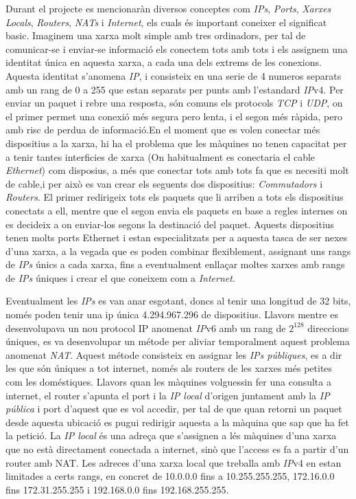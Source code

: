 Durant el projecte es mencionaràn diversos conceptes com \textit{IPs}, \textit{Ports}, \textit{Xarxes Locals}, \textit{Routers}, \textit{NATs} i \textit{Internet}, els cuals és important coneixer el significat basic. Imaginem una xarxa molt simple amb tres ordinadors, per tal de comunicar-se i enviar-se informació els conectem tots amb tots i els assignem una identitat única en aquesta xarxa, a cada una dels extrems de les conexions. Aquesta identitat s'anomena \textit{IP}, i consisteix en una serie de 4 numeros separats amb un rang de 0 a 255 que estan separats per punts amb l'estandard \textit{IP}v4. Per enviar un paquet i rebre una resposta, són comuns els protocols \textit{TCP} i \textit{UDP}, on el primer permet una conexió més segura pero lenta, i el segon més ràpida, pero amb risc de perdua de informació.En el moment que es volen conectar més dispositius a la xarxa, hi ha el problema que les màquines no tenen capacitat per a tenir tantes interficies de xarxa (On habitualment es conectaria el cable \textit{Ethernet}) com disposius, a més que conectar tots amb tots fa que es necesiti molt de cable,i per això es van crear els seguents dos dispositius: \textit{Commutadors} i \textit{Routers}. El primer redirigeix tots els paquets que li arriben a tots els dispositius conectats a ell, mentre que el segon envia els paquets en base a regles internes on es decideix a on enviar-los segons la destinació del paquet. Aquests dispositius tenen molts ports Ethernet i estan especialitzats per a aquesta tasca de ser nexes d'una xarxa, a la vegada que es poden combinar flexiblement, assignant uns rangs de \textit{IPs} únics a cada xarxa, fins a eventualment enllaçar moltes xarxes amb rangs de \textit{IPs} úniques i crear el que coneixem com a \textit{Internet}.\cite{hunt_tcpip_2002}

Eventualment les \textit{IPs} es van anar esgotant, doncs al tenir una longitud de 32 bits, només poden tenir una ip única 4.294.967.296 de dispositius. Llavors mentre es desenvolupava un nou protocol IP anomenat \textit{IP}v6 amb un rang de $2^{128}$ direccions úniques, es va desenvolupar un métode per aliviar temporalment aquest problema anomenat \textit{NAT}. Aquest métode consisteix en assignar les \textit{IPs públiques}, es a dir les que són úniques a tot internet, només als routers de les xarxes més petites com les doméstiques. Llavors quan les màquines volguessin fer una consulta a internet, el router s'apunta el port i la \textit{IP local} d'origen juntament amb la \textit{IP pública} i port d'aquest que es vol accedir, per tal de que quan retorni un paquet desde aquesta ubicació es pugui redirigir aquesta a la màquina que sap que ha fet la petició. La \textit{IP local} és una adreça que s'assignen a lés màquines d'una xarxa que no està directament conectada a internet, sinò que l'access es fa a partir d'un router amb NAT. Les adreces d'una xarxa local que treballa amb \textit{IP}v4 en estan limitades a certs rangs, en concret de 10.0.0.0 fins a 10.255.255.255, 172.16.0.0 fins 172.31.255.255 i 192.168.0.0 fins 192.168.255.255. \cite{wu_transition_2013}

